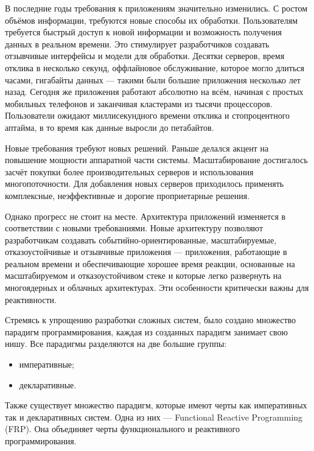 \label{sec:intro}

В последние годы требования к приложениям значительно изменились. С ростом объёмов информации, требуются новые способы их обработки. Пользователям требуется быстрый доступ к новой информации и возможность получения данных в реальном времени. Это стимулирует разработчиков создавать отзывчивые интерфейсы и модели для обработки. Десятки серверов, время отклика в несколько секунд, оффлайновое обслуживание, которое могло длиться часами, гигабайты данных --- такими были большие приложения несколько лет назад. Сегодня же приложения работают абсолютно на всём, начиная с простых мобильных телефонов и заканчивая кластерами из тысячи процессоров. Пользователи ожидают миллисекундного времени отклика и стопроцентного аптайма, в то время как данные выросли до петабайтов.

Новые требования требуют новых решений. Раньше делался акцент на повышение мощности аппаратной части системы. Масштабирование достигалось засчёт покупки более производительных серверов и использования многопоточности. Для добавления новых серверов приходилось применять комплексные, неэффективные и дорогие проприетарные решения.

Однако прогресс не стоит на месте. Архитектура приложений изменяется в соответствии с новыми требованиями. Новые архитектуру позволяют разработчикам создавать событийно-ориентированные, масштабируемые, отказоустойчивые и отзывчивые приложения --- приложения, работающие в реальном времени и обеспечивающие хорошее время реакции, основанные на масштабируемом и отказоустойчивом стеке и которые легко развернуть на многоядерных и облачных архитектурах. Эти особенности критически важны для реактивности.

Стремясь к упрощению разработки сложных систем, было создано множество парадигм программирования, каждая из созданных парадигм занимает свою нишу. Все парадигмы разделяются на две большие группы:

\begin{itemize}
  \item императивные;
  \item декларативные.
\end{itemize}

Также существует множество парадигм, которые имеют черты как императивных так и декларативных систем. Одна из них --- Functional Reactive Programming (FRP). Она объединяет черты функционального и реактивного программирования.


